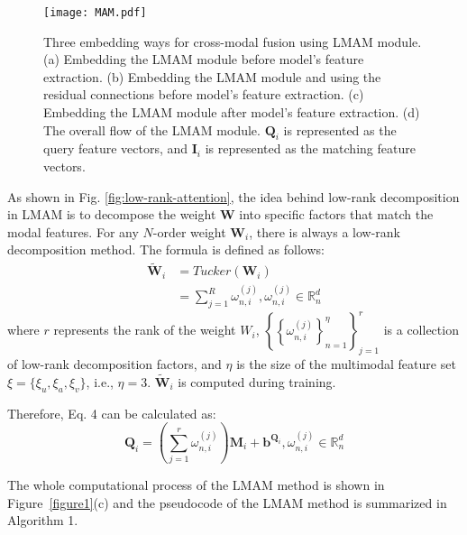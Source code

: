 {{\begin{figure*}
	\centering
	\texttt{[image: MAM.pdf]}
	\caption{Three embedding ways for cross-modal fusion using LMAM module. (a) Embedding the LMAM module before model's feature extraction. (b) Embedding the LMAM module and using the residual connections before model's feature extraction. (c) Embedding the LMAM module after model's feature extraction. (d) The overall flow of the LMAM module. {$\boldsymbol{Q}_i$ is represented as the query feature vectors, and $\boldsymbol{I}_i$ is represented as the matching feature vectors.}}
	\label{fig:attention}
\end{figure*}

{As shown in Fig. \ref{fig:low-rank-attention}, the idea behind low-rank decomposition in LMAM is to decompose the {weight $\boldsymbol{W}$} into specific factors that match the modal features. For any $N$-order weight $\boldsymbol{W}_i$, there is always a low-rank decomposition method. The formula is defined as follows:}
\begin{equation}
	\begin{aligned}
	\widetilde{\boldsymbol{W}}_i&=Tucker(\boldsymbol{W}_i) \\
	&=\sum_{j=1}^R \omega_{n, i}^{(j)}, \omega_{n, i}^{(j)} \in \mathbb{R}_n^d
	\end{aligned}
\end{equation}
{where $r$ represents the rank of the weight $W_i$, {$\left\{\left\{\omega_{n, i}^{(j)}\right\}_{n=1}^\eta\right\}_{j=1}^r$} is a collection of low-rank decomposition factors, and $\eta$ is the size of the multimodal feature set $\xi=\{\xi_u,\xi_a,\xi_v\}$, i.e., $\eta=3$. $\widetilde{\boldsymbol{W}}_i$ is computed during training.}

{Therefore, Eq. 4 can be calculated as:}
\begin{equation}
	\boldsymbol{Q}_i=\left(\sum_{j=1}^r \omega_{n, i}^{(j)}\right)\boldsymbol{M}_i+\boldsymbol{b}^{\boldsymbol{Q}_i}, \omega_{n, i}^{(j)} \in \mathbb{R}_n^d
\end{equation}

The whole computational process of the LMAM method is shown in Figure~\ref{figure1}(c) and the pseudocode of the LMAM method is summarized in Algorithm 1.

}}
